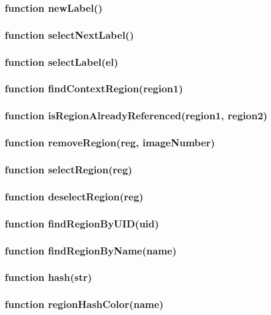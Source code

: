 \subsubsection{function newLabel()}

\subsubsection{function selectNextLabel()}
\subsubsection{function selectLabel(el)}

\subsubsection{function findContextRegion(region1)}
\subsubsection{function isRegionAlreadyReferenced(region1, region2)}
\subsubsection{function removeRegion(reg, imageNumber)}
\subsubsection{function selectRegion(reg)}
\subsubsection{function deselectRegion(reg)}
\subsubsection{function findRegionByUID(uid)}
\subsubsection{function findRegionByName(name)}
\subsubsection{function hash(str)}
\subsubsection{function regionHashColor(name)}
